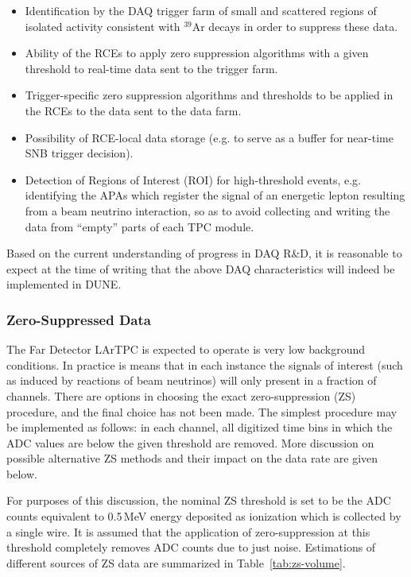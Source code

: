 \begin{itemize}

\item Identification by the DAQ trigger farm of small and scattered regions of isolated activity
  consistent with $^{39}$Ar decays in order to suppress these data.

\item Ability of the RCEs to apply zero suppression algorithms
with a given threshold to real-time data sent to the trigger farm.

\item Trigger-specific zero suppression algorithms and thresholds to be applied
in the RCEs to the data sent to the data farm.

\item Possibility of RCE-local data storage (e.g. to serve as a buffer for near-time SNB trigger decision).

\item Detection of Regions of Interest (ROI) for high-threshold events, e.g. identifying the APAs
which register the signal of an energetic lepton resulting from a beam neutrino interaction, so as
to avoid collecting and writing the data from ``empty'' parts of each TPC module.

\end{itemize}

\noindent
Based on the current understanding of progress in DAQ R\&D, it is reasonable to expect at the time of
writing that the above DAQ characteristics will indeed be implemented in DUNE.




\subsubsection{Zero-Suppressed Data}
\label{sec:zs-data}
The Far Detector LArTPC is expected to operate is very low background conditions. In practice
is means that in each instance the signals of interest (such as induced by reactions of beam neutrinos)
will only present in a fraction of channels. There are options in choosing the exact zero-suppression (ZS)
procedure, and the final choice has not been made. The simplest procedure may be implemented
as follows: in each channel, all digitized time bins in which the ADC values are below the given threshold
are removed. More discussion on possible alternative ZS methods and their impact on the data rate are given below.

For purposes of this discussion, the nominal ZS threshold is set to be the ADC counts equivalent to 0.5\,MeV energy deposited
as ionization which is collected by a single wire. It is assumed that the application of zero-suppression at this
threshold completely removes ADC counts due to just noise. %
Estimations of different sources of ZS data are summarized in Table~\ref{tab:zs-volume}.


